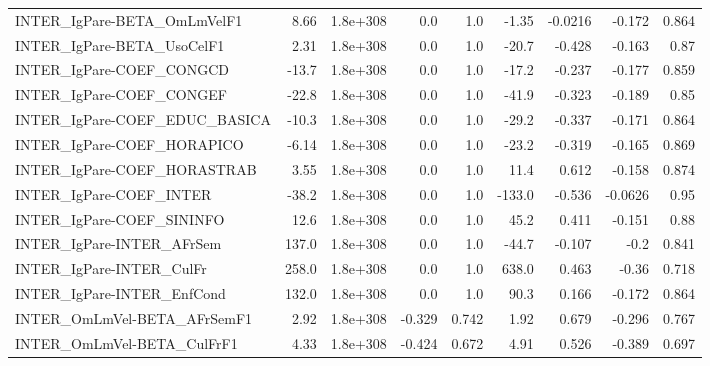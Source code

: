 \begin{tabular}{lrrrrrrrr}
INTER\_IgPare-BETA\_OmLmVelF1           &        8.66 &     1.8e+308 &      0.0 &      1.0 &      -1.35 &     -0.0216 &       -0.172 &         0.864 \\
INTER\_IgPare-BETA\_UsoCelF1            &        2.31 &     1.8e+308 &      0.0 &      1.0 &      -20.7 &      -0.428 &       -0.163 &          0.87 \\
INTER\_IgPare-COEF\_CONGCD              &       -13.7 &     1.8e+308 &      0.0 &      1.0 &      -17.2 &      -0.237 &       -0.177 &         0.859 \\
INTER\_IgPare-COEF\_CONGEF              &       -22.8 &     1.8e+308 &      0.0 &      1.0 &      -41.9 &      -0.323 &       -0.189 &          0.85 \\
INTER\_IgPare-COEF\_EDUC\_BASICA         &       -10.3 &     1.8e+308 &      0.0 &      1.0 &      -29.2 &      -0.337 &       -0.171 &         0.864 \\
INTER\_IgPare-COEF\_HORAPICO            &       -6.14 &     1.8e+308 &      0.0 &      1.0 &      -23.2 &      -0.319 &       -0.165 &         0.869 \\
INTER\_IgPare-COEF\_HORASTRAB           &        3.55 &     1.8e+308 &      0.0 &      1.0 &       11.4 &       0.612 &       -0.158 &         0.874 \\
INTER\_IgPare-COEF\_INTER               &       -38.2 &     1.8e+308 &      0.0 &      1.0 &     -133.0 &      -0.536 &      -0.0626 &          0.95 \\
INTER\_IgPare-COEF\_SININFO             &        12.6 &     1.8e+308 &      0.0 &      1.0 &       45.2 &       0.411 &       -0.151 &          0.88 \\
INTER\_IgPare-INTER\_AFrSem             &       137.0 &     1.8e+308 &      0.0 &      1.0 &      -44.7 &      -0.107 &         -0.2 &         0.841 \\
INTER\_IgPare-INTER\_CulFr              &       258.0 &     1.8e+308 &      0.0 &      1.0 &      638.0 &       0.463 &        -0.36 &         0.718 \\
INTER\_IgPare-INTER\_EnfCond            &       132.0 &     1.8e+308 &      0.0 &      1.0 &       90.3 &       0.166 &       -0.172 &         0.864 \\
INTER\_OmLmVel-BETA\_AFrSemF1           &        2.92 &     1.8e+308 &   -0.329 &    0.742 &       1.92 &       0.679 &       -0.296 &         0.767 \\
INTER\_OmLmVel-BETA\_CulFrF1            &        4.33 &     1.8e+308 &   -0.424 &    0.672 &       4.91 &       0.526 &       -0.389 &         0.697 \\

\end{tabular}
